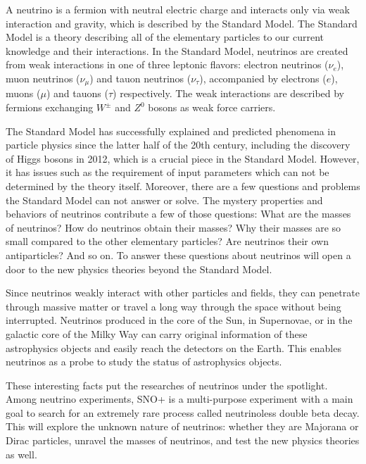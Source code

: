 
A neutrino is a fermion with neutral electric charge and interacts only via weak interaction and gravity, which is described by the Standard Model. The Standard Model is a theory describing all of the elementary particles to our current knowledge and their interactions.
In the Standard Model, neutrinos are created from weak interactions in one of three leptonic flavors:
electron neutrinos ($\nu_e$), muon neutrinos ($\nu_\mu$) and tauon neutrinos ($\nu_\tau$), accompanied by electrons ($e$), muons ($\mu$) and tauons ($\tau$) respectively. The weak interactions are described by fermions exchanging $W^{\pm}$ and $Z^0$ bosons as weak force carriers.

The Standard Model has successfully explained and predicted phenomena in particle physics since the latter half of the 20th century, including the discovery of Higgs bosons in 2012, which is a crucial piece in the Standard Model. However, it has issues such as the requirement of input parameters which can not be determined by the theory itself. Moreover, there are a few questions and problems the Standard Model can not answer or solve. The mystery properties and behaviors of neutrinos contribute a few of those questions: What are the masses of neutrinos? How do neutrinos obtain their masses? Why their masses are so small compared to the other elementary particles? Are neutrinos their own antiparticles? And so on. To answer these questions about neutrinos will open a door to the new physics theories beyond the Standard Model.

Since neutrinos weakly interact with other particles and fields, they can penetrate through massive matter or travel a long way through the space without being interrupted. Neutrinos produced in the core of the Sun, in Supernovae, or in the galactic core of the Milky Way can carry original information of these astrophysics objects and easily reach the detectors on the Earth. This enables neutrinos as a probe to study the status of astrophysics objects.

These interesting facts put the researches of neutrinos under the spotlight. Among neutrino experiments, SNO+ is a multi-purpose experiment with a main goal to search for an extremely rare process called neutrinoless double beta decay. This will explore the unknown nature of neutrinos: whether they are Majorana or Dirac
particles, unravel the masses of neutrinos, and test the new physics theories as well.

